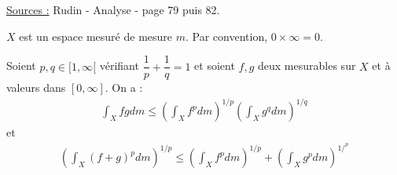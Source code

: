 

\pagestyle{fancy}

\fancyhead[R]{}



\underline{Sources :} Rudin - Analyse - page 79 puis 82.

$X$ est un espace mesuré de mesure $m$. Par convention, $0 \times \infty = 0$.

\begin{thm}
Soient $p, q \in [1, \infty[$ vérifiant $\dfrac1{p} + \dfrac1{q} = 1$ et soient $f, g$ deux mesurables sur $X$ et à valeurs dans $[0, \infty]$.
On a :
\begin{align}
\int_X fg dm \leq \left( \int_X f^p dm \right )^{1/p} \left( \int_X g^q dm \right )^{1/q}
\end{align}
et
\begin{align}
\left ( \int_X (f+g)^p dm \right )^{1/p} \leq \left( \int_X f^p dm \right )^{1/p} +  \left( \int_X g^p dm \right )^{1/^p}
\end{align}
\end{thm}


